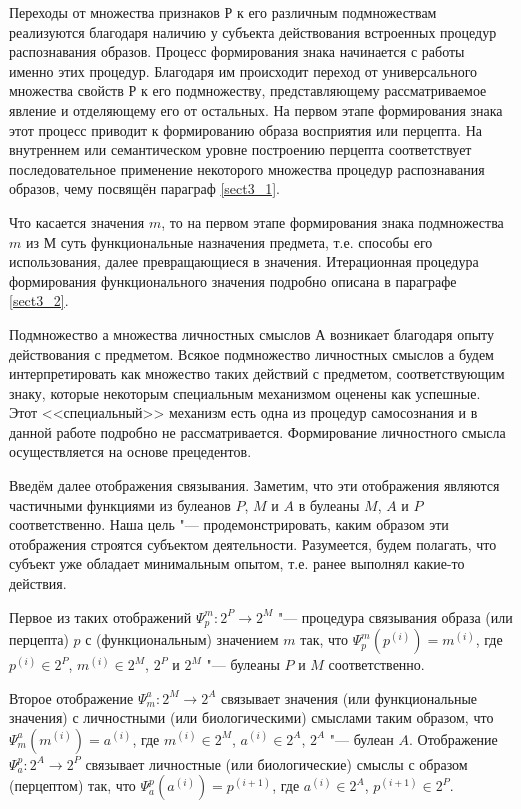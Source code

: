 Переходы от множества признаков $Р$ к его различным подмножествам реализуются благодаря наличию у субъекта действования встроенных процедур распознавания образов. Процесс формирования знака начинается с работы именно этих процедур. Благодаря им происходит переход от универсального множества свойств $Р$ к его подмножеству, представляющему рассматриваемое явление и отделяющему его от остальных. На первом этапе формирования знака этот процесс приводит к формированию образа восприятия или перцепта. На внутреннем или семантическом уровне построению перцепта соответствует последовательное применение некоторого множества процедур распознавания образов, чему посвящён параграф \ref{sect3_1}.

Что касается значения $m$, то на первом этапе формирования знака подмножества $m$ из $М$ суть функциональные назначения предмета, т.е. способы его использования, далее превращающиеся в значения. Итерационная процедура формирования функционального значения подробно описана в параграфе \ref{sect3_2}.

Подмножество $а$ множества личностных смыслов $А$ возникает благодаря опыту действования с предметом. Всякое подмножество личностных смыслов а будем интерпретировать как множество таких действий с предметом, соответствующим знаку, которые некоторым специальным механизмом оценены как успешные. Этот <<специальный>> механизм есть одна из процедур самосознания и в данной работе подробно не рассматривается. Формирование личностного смысла осуществляется на основе прецедентов.

Введём далее отображения связывания. Заметим, что эти отображения являются частичными функциями из булеанов $P$, $M$ и $A$ в булеаны $M$, $A$ и $P$ соответственно. Наша цель "--- продемонстрировать, каким образом эти отображения строятся субъектом деятельности. Разумеется, будем полагать, что субъект уже обладает минимальным опытом, т.е. ранее выполнял какие-то действия.

Первое из таких отображений $\Psi_p^m:2^P\rightarrow 2^M$ "--- процедура связывания образа (или перцепта) $p$ с (функциональным) значением $m$ так, что $\Psi_p^m(p^{(i)})=m^{(i)}$, где $p^{(i)}\in 2^P$, $m^{(i)}\in 2^M$, $2^P$ и $2^M$ "--- булеаны $P$ и $M$ соответственно.

Второе отображение $\Psi_m^a:2^M\rightarrow 2^A$ связывает значения (или функциональные значения) с личностными (или биологическими) смыслами таким образом, что $\Psi_m^a(m^{(i)})=a^{(i)}$, где $m^{(i)}\in 2^M$, $a^{(i)}\in 2^A$, $2^A$ "--- булеан $A$. Отображение $\Psi_a^p:2^A\rightarrow 2^P$ связывает личностные (или биологические) смыслы с образом (перцептом) так, что $\Psi_a^p(a^{(i)})=p^{(i+1)}$, где $a^{(i)}\in 2^A$, $p^{(i+1)}\in 2^P$.

